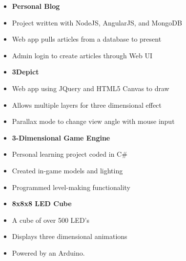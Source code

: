 \documentclass{article}
\begin{document}
\begin{minipage}[t]{0.5\textwidth}
  \vspace{0.5mm}
  \begin{itemize}
    \item[] {\bf Personal Blog } \\[-0.5mm]   
    \item[] Project written with NodeJS, AngularJS, and MongoDB \\[-1.5mm]   
    \item[] Web app pulls articles from a database to present \\[-1.5mm]   
    \item[] Admin login to create articles through Web UI \\[2mm]
    \item[] {\bf 3Depict } \\[-0.5mm]   
    \item[] Web app using JQuery and HTML5 Canvas to draw \\[-1.5mm]   
    \item[] Allows multiple layers for three dimensional effect \\[-1.5mm]   
    \item[] Parallax mode to change view angle with mouse input 
  \end{itemize}
\end{minipage}
\begin{minipage}[t]{0.5\textwidth}
  \vspace{0.5mm}
  \begin{itemize}
    \item[] {\bf 3-Dimensional Game Engine } \\[-0.5mm]   
    \item[] Personal learning project coded in C\# \\[-1.5mm]   
    \item[] Created in-game models and lighting  \\[-1.5mm]   
    \item[] Programmed level-making functionality \\[2mm]
    \item[] {\bf 8x8x8 LED Cube } \\[-0.5mm]   
    \item[] A cube of over 500 LED's \\[-1.5mm]   
    \item[] Displays three dimensional animations \\[-1.5mm]   
    \item[] Powered by an Arduino. 
  \end{itemize}
\end{minipage}
\end{document}
